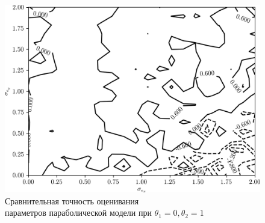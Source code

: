 \begin{figure}[b]
  \centering
  \includegraphics[width=135mm]{fig/nonlinear/quadratic/a-0_b-0_c-1.png}
  \caption{
    Сравнительная точность оценивания \\
    параметров параболической модели при \( \theta_1 = 0, \theta_2 = 1 \)
  }\label{fig:comparison_nonlinear_quadratic_b-0_c-1}
\end{figure}

